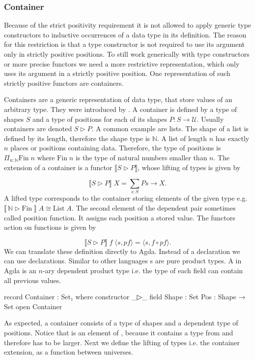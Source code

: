 \subsubsection{Container}
\label{container}

Because of the strict positivity requirement it is not allowed to apply generic
type constructors to inductive occurrences of a data type in its definition.
The reason for this restriction is that a type constructor is not required to
use its argument only in strictly positive positions.
To still work generically with type constructors or more precise functors we
need a more restrictive representation, which only uses its argument in a
strictly positive position.
One representation of such strictly positive functors are containers.

Containers are a generic representation of data type, that store values of an
arbitrary type.
They were introduced by \textcite{DBLP:conf/fossacs/AbbottAG03}.
A container is defined by a type of shapes $S$ and a type of positions for each
of its shapes $P : S \rightarrow \mathcal{U}$.
Usually containers are denoted $S \rhd P$.
A common example are lists.
The shape of a list is defined by its length, therefore the shape type is
$\mathbb{N}$.
A list of length $n$ has exactly $n$ places or positions containing data.
Therefore, the type of positions is $\Pi_{n : \mathbb{N}}\mathrm{Fin}\;n$ where
$\mathrm{Fin}\;n$ is the type of natural numbers smaller than $n$.
The extension of a container is a functor $\lBrack S \rhd P \rBrack $,
whose lifting of types is given by

$$
  \lBrack S \rhd P \rBrack\;X = \sum\limits_{s : S} P s \rightarrow X.
$$
A lifted type corresponds to the container storing elements of the given type
e.g. $\lBrack\, \mathbb{N} \rhd \mathrm{Fin}\;\rBrack \; A \cong
\mathrm{List}\;A$.
The second element of the dependent pair sometimes called position function.
It assigns each position a stored value.
The functors action on functions is given by

$$
  \lBrack S \rhd P \rBrack \;f\;\langle s , pf \rangle = \langle s , f \circ pf \rangle.
$$
We can translate these definition directly to Agda.
Instead of a  declaration we can use 
declarations.
Similar to other languages s are pure product types.
A  in Agda is an $n$-ary dependent product type i.e. the
type of each field can contain all previous values.

\begin{code}
record Container : Set₁ where
  constructor _▷_
  field
    Shape : Set
    Pos : Shape → Set
open Container
\end{code}
As expected, a container consists of a type of shapes and a dependent type of
positions.
Notice that  is an element of ,
because it contains a type from  and therefore has to be
larger.
Next we define the lifting of types i.e. the container extension, as a function
between universes.

